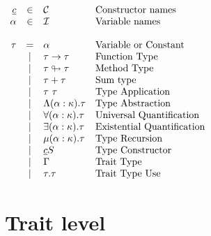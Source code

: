 \documentclass{article}[11pt]
\begin{document}
    \begin{math}
        \begin{array}{rclp{5cm}}
            \underline{c} & \in  & {\cal C}                     & Constructor names          \\
            \alpha        & \in  & {\cal I}                     & Variable names             \\
            \\
            \tau & =
            & \alpha                       & Variable or Constant              \\
            & \mid & \tau \rightarrow \tau        & Function Type              \\
            & \mid & \tau \looparrowright \tau    & Method Type              \\
            & \mid & \tau + \tau                  & Sum type              \\
            & \mid & \tau~\tau                    & Type Application              \\
            & \mid & \Lambda (\alpha:\kappa).\tau & Type Abstraction              \\
            & \mid & \forall (\alpha:\kappa).\tau & Universal Quantification              \\
            & \mid & \exists (\alpha:\kappa).\tau & Existential Quantification              \\
            & \mid & \mu(\alpha:\kappa).\tau      & Type Recursion              \\
            & \mid & \underline{c} S              & Type Constructor              \\
            & \mid & \Gamma                       & Trait Type              \\
            & \mid & \tau . \tau                  & Trait Type Use              \\
        \end{array}
    \end{math}


    \section{Trait level}\label{sec:trait-level}
\end{document}
